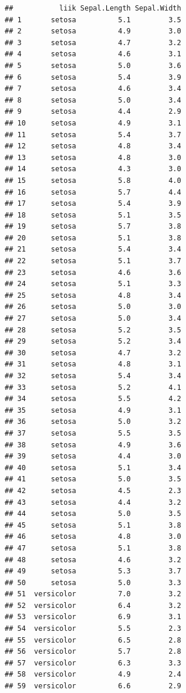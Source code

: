 \documentclass[]{book}
\begin{document}
\begin{verbatim}
##           liik Sepal.Length Sepal.Width
## 1       setosa          5.1         3.5
## 2       setosa          4.9         3.0
## 3       setosa          4.7         3.2
## 4       setosa          4.6         3.1
## 5       setosa          5.0         3.6
## 6       setosa          5.4         3.9
## 7       setosa          4.6         3.4
## 8       setosa          5.0         3.4
## 9       setosa          4.4         2.9
## 10      setosa          4.9         3.1
## 11      setosa          5.4         3.7
## 12      setosa          4.8         3.4
## 13      setosa          4.8         3.0
## 14      setosa          4.3         3.0
## 15      setosa          5.8         4.0
## 16      setosa          5.7         4.4
## 17      setosa          5.4         3.9
## 18      setosa          5.1         3.5
## 19      setosa          5.7         3.8
## 20      setosa          5.1         3.8
## 21      setosa          5.4         3.4
## 22      setosa          5.1         3.7
## 23      setosa          4.6         3.6
## 24      setosa          5.1         3.3
## 25      setosa          4.8         3.4
## 26      setosa          5.0         3.0
## 27      setosa          5.0         3.4
## 28      setosa          5.2         3.5
## 29      setosa          5.2         3.4
## 30      setosa          4.7         3.2
## 31      setosa          4.8         3.1
## 32      setosa          5.4         3.4
## 33      setosa          5.2         4.1
## 34      setosa          5.5         4.2
## 35      setosa          4.9         3.1
## 36      setosa          5.0         3.2
## 37      setosa          5.5         3.5
## 38      setosa          4.9         3.6
## 39      setosa          4.4         3.0
## 40      setosa          5.1         3.4
## 41      setosa          5.0         3.5
## 42      setosa          4.5         2.3
## 43      setosa          4.4         3.2
## 44      setosa          5.0         3.5
## 45      setosa          5.1         3.8
## 46      setosa          4.8         3.0
## 47      setosa          5.1         3.8
## 48      setosa          4.6         3.2
## 49      setosa          5.3         3.7
## 50      setosa          5.0         3.3
## 51  versicolor          7.0         3.2
## 52  versicolor          6.4         3.2
## 53  versicolor          6.9         3.1
## 54  versicolor          5.5         2.3
## 55  versicolor          6.5         2.8
## 56  versicolor          5.7         2.8
## 57  versicolor          6.3         3.3
## 58  versicolor          4.9         2.4
## 59  versicolor          6.6         2.9

\end{verbatim}
\end{document}
